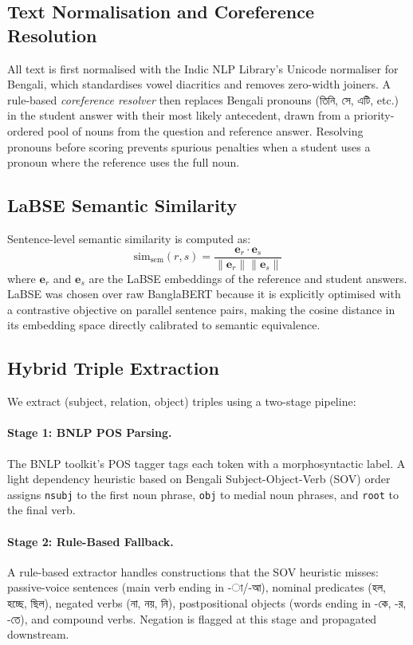 \documentclass[11pt]{article}
\newcommand{\bn}[1]{{\bengalifont #1}}
\begin{document}
\subsection{Text Normalisation and Coreference Resolution}

All text is first normalised with the Indic NLP Library's Unicode normaliser for Bengali, which standardises vowel diacritics and removes zero-width joiners. A rule-based \emph{coreference resolver} then replaces Bengali pronouns (\bn{তিনি, সে, এটি}, etc.) in the student answer with their most likely antecedent, drawn from a priority-ordered pool of nouns from the question and reference answer. Resolving pronouns before scoring prevents spurious penalties when a student uses a pronoun where the reference uses the full noun.

\subsection{LaBSE Semantic Similarity}

Sentence-level semantic similarity is computed as:
\begin{equation}
  \mathrm{sim}_\mathrm{sem}(r, s) = \frac{\mathbf{e}_r \cdot \mathbf{e}_s}{\|\mathbf{e}_r\| \|\mathbf{e}_s\|}
\end{equation}
where $\mathbf{e}_r$ and $\mathbf{e}_s$ are the LaBSE embeddings of the reference and student answers. LaBSE was chosen over raw BanglaBERT because it is explicitly optimised with a contrastive objective on parallel sentence pairs, making the cosine distance in its embedding space directly calibrated to semantic equivalence.

\subsection{Hybrid Triple Extraction}

We extract (subject, relation, object) triples using a two-stage pipeline:

\paragraph{Stage 1: BNLP POS Parsing.} The BNLP toolkit's POS tagger tags each token with a morphosyntactic label. A light dependency heuristic based on Bengali Subject-Object-Verb (SOV) order assigns \texttt{nsubj} to the first noun phrase, \texttt{obj} to medial noun phrases, and \texttt{root} to the final verb.

\paragraph{Stage 2: Rule-Based Fallback.} A rule-based extractor handles constructions that the SOV heuristic misses: passive-voice sentences (main verb ending in \bn{-া/-আ}), nominal predicates (\bn{হল, হচ্ছে, ছিল}), negated verbs (\bn{না, নয়, নি}), postpositional objects (words ending in \bn{-কে, -র, -তে}), and compound verbs. Negation is flagged at this stage and propagated downstream.
\end{document}
